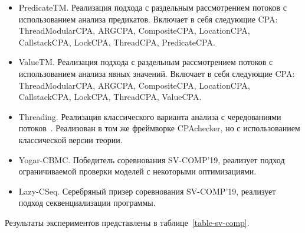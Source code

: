 \begin{itemize}
\item PredicateTM. Реализация подхода с раздельным рассмотрением потоков с использованием анализа предикатов. 
Включает в себя следующие CPA: ThreadModularCPA, ARGCPA, CompositeCPA, LocationCPA, CallstackCPA, LockCPA, ThreadCPA, PredicateCPA.
\item ValueTM. Реализация подхода с раздельным рассмотрением потоков с использованием анализа явных значений. 
Включает в себя следующие CPA: ThreadModularCPA, ARGCPA, CompositeCPA, LocationCPA, CallstackCPA, LockCPA, ThreadCPA, ValueCPA.
\item Threading. Реализация классического варианта анализа с чередованиями потоков~\cite{MEMICS16-Multi-Threaded}. 
Реализован в том же фреймворке CPAchecker, но с использованием классической версии теории.
\item Yogar-CBMC. Победитель соревнования SV-COMP'19, реализует подход ограничиваемой проверки моделей с некоторыми оптимизациями.
\item Lazy-CSeq. Серебряный призер соревнования SV-COMP'19, реализует подход секвенциализации программы.
\end{itemize}

Результаты экспериментов представлены в таблице~\ref{table-sv-comp}.

